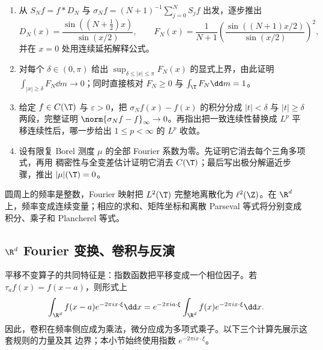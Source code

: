 \begin{exercise}
\begin{enumerate}
  \item 从 $S_Nf=f*D_N$ 与 $\sigma_Nf=(N+1)^{-1}\sum_{j=0}^NS_jf$ 出发，逐步推出
        \[
        D_N(x)=\frac{\sin((N+\tfrac12)x)}{\sin(x/2)},\qquad
        F_N(x)=\frac1{N+1}\left(\frac{\sin((N+1)x/2)}{\sin(x/2)}\right)^2,
        \]
        并在 $x=0$ 处用连续延拓解释公式。
  \item 对每个 $\delta\in(0,\pi)$ 给出
        $\sup_{\delta\le |x|\le\pi}F_N(x)$ 的显式上界，由此证明
        $\int_{|x|\ge\delta}F_N\dd m\to0$；同时直接核对 $F_N\ge0$ 与
        $\int_\T F_N\dd m=1$。
  \item 给定 $f\in C(\T)$ 与 $\varepsilon>0$，把
        $\sigma_Nf(x)-f(x)$ 的积分分成 $|t|<\delta$ 与 $|t|\ge\delta$ 两段，完整证明
        $\norm{\sigma_Nf-f}_\infty\to0$。再指出把一致连续性替换成 $L^p$ 平移连续性后，哪一步给出
        $1\le p<\infty$ 的 $L^p$ 收敛。
  \item 设有限复 Borel 测度 $\mu$ 的全部 Fourier 系数为零。先证明它消去每个三角多项式，再用
        \Fejer{} 稠密性与全变差估计证明它消去 $C(\T)$；最后写出极分解逼近步骤，推出
        $|\mu|(\T)=0$。
\end{enumerate}
\end{exercise}

圆周上的频率是整数，Fourier 映射把 $L^2(\T)$ 完整地离散化为 $\ell^2(\Z)$。在
$\R^d$ 上，频率变成连续变量；相应的求和、矩阵坐标和离散 Parseval 等式将分别变成积分、乘子和
Plancherel 等式。


\subsection{\texorpdfstring{$\R^d$}{R d} Fourier 变换、卷积与反演}\label{subsec:7-2-2}

平移不变算子的共同特征是：指数函数把平移变成一个相位因子。若
$\tau_af(x)=f(x-a)$，则形式上
\[
 \int_{\R^d}f(x-a)e^{-2\pi ix\cdot\xi}\dd x
 =e^{-2\pi ia\cdot\xi}\int_{\R^d}f(x)e^{-2\pi ix\cdot\xi}\dd x.
\]
因此，卷积在频率侧应成为乘法，微分应成为多项式乘子。以下三个计算先展示这套规则的力量及其
边界；本小节始终使用指数 $e^{-2\pi ix\cdot\xi}$。

